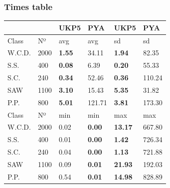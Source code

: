 \documentclass{beamer}
\begin{document}
\begin{frame}
\frametitle{Times table}
\begin{tabular}{llllll}
        &  & UKP5 & PYA & UKP5 & PYA\\ \hline
Class & Nº	& avg & avg & sd & sd \\ \hline
W.C.D. & 2000 	& \textbf{1.55} & 34.11 & \textbf{1.94} & 82.35 \\ \hline
S.S. & 400 	& \textbf{0.08} & 6.39 & \textbf{0.20} & 55.33 \\ \hline
S.C. & 240 	& \textbf{0.34} & 52.46 & \textbf{0.36} & 110.24 \\ \hline
SAW & 1100	& \textbf{3.10} & 15.43 & \textbf{5.35} & 31.82 \\ \hline
P.P. & 800 	& \textbf{5.01} & 121.71 & \textbf{3.81} & 173.30 \\
Class & Nº	& min & min & max & max \\ \hline
W.C.D. & 2000 	& 0.02 & \textbf{0.00} & \textbf{13.17} & 667.80 \\ \hline
S.S. & 400 	& 0.01 & \textbf{0.00} & \textbf{1.42} & 726.34 \\ \hline
S.C. & 240 	& 0.04 & \textbf{0.00} & \textbf{1.13} & 721.88 \\ \hline
SAW & 1100 	& 0.09 & \textbf{0.01} & \textbf{21.93} & 192.03 \\ \hline
P.P. & 800 	& 0.54 & \textbf{0.01} & \textbf{14.98} & 828.89 \\
\end{tabular}
\end{frame}
\end{document}
